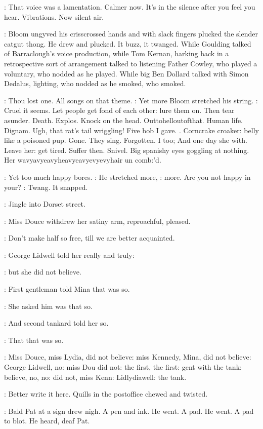 \BloomInt:
That voice was a lamentation.
Calmer now.
It's in the silence after
you feel you hear.
Vibrations.
Now silent air.

:
Bloom ungyved his crisscrossed hands and with slack fingers plucked
the slender catgut thong.
He drew and plucked.
It buzz,
it twanged.
While
Goulding talked of Barraclough's voice production,
while Tom Kernan,
harking back in a retrospective sort of arrangement talked to listening
Father Cowley,
who played a voluntary,
who nodded as he played.
While
big Ben Dollard talked with Simon Dedalus,
lighting,
who nodded as he
smoked,
who smoked.

\BloomInt:
Thou lost one.
All songs on that theme.
:
Yet more Bloom stretched his string.
\BloomInt:
Cruel it seems.
Let people get fond of each other:
lure them on.
Then tear asunder.
Death.
Explos.
Knock on the head.
Outtohelloutofthat.
Human life.
Dignam.
Ugh,
that rat's tail wriggling!
Five bob I gave.
.
Corncrake croaker:
belly like a poisoned pup.
Gone.
They sing.
Forgotten.
I too; And one day she with.
Leave her:
get tired.
Suffer then.
Snivel.
Big spanishy eyes goggling at nothing.
Her
wavyavyeavyheavyeavyevyevyhair un comb:'d.

\BloomInt:
Yet too much happy bores.
:
He stretched more,
\BloomInt:
more.
Are you not happy in your?
:
Twang.
It snapped.

:
Jingle into Dorset street.

:
Miss Douce withdrew her satiny arm,
reproachful,
pleased.

\MissD:
Don't make half so free,
till we are better acquainted.

:
George Lidwell told her really and truly:

:
but she did not believe.

:
First gentleman told Mina that was so.

:
She asked him was that so.

:
And second tankard told her so.

:
That that was so.

:
Miss Douce,
miss Lydia,
did not believe:
miss Kennedy,
Mina,
did not
believe:
George Lidwell,
no:
miss Dou did not:
the first,
the first:
gent
with the tank:
believe,
no,
no:
did not,
miss Kenn:
Lidlydiawell:
the
tank.

\BloomInt:
Better write it here.
Quills in the postoffice chewed and twisted.

:
Bald Pat at a sign drew nigh.
A pen and ink.
He went.
A pad.
He
went.
A pad to blot.
He heard,
deaf Pat.

